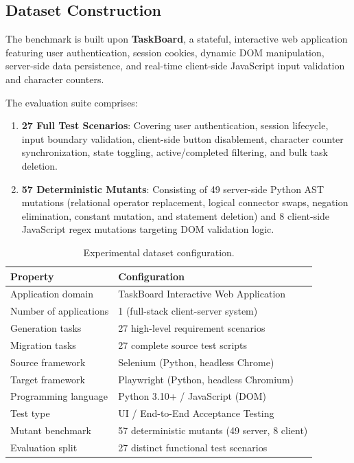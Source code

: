 \documentclass[pdflatex,sn-mathphys-num]{sn-jnl}
\begin{document}
\subsection{Dataset Construction}
\label{subsec:dataset}

The benchmark is built upon \textbf{TaskBoard}, a stateful, interactive web
application featuring user authentication, session cookies, dynamic DOM
manipulation, server-side data persistence, and real-time client-side JavaScript
input validation and character counters.

The evaluation suite comprises:
\begin{enumerate}[leftmargin=*]
    \item \textbf{27 Full Test Scenarios}: Covering user authentication, session
    lifecycle, input boundary validation, client-side button disablement,
    character counter synchronization, state toggling, active/completed filtering,
    and bulk task deletion.
    \item \textbf{57 Deterministic Mutants}: Consisting of 49 server-side Python
    AST mutations (relational operator replacement, logical connector swaps,
    negation elimination, constant mutation, and statement deletion) and 8
    client-side JavaScript regex mutations targeting DOM validation logic.
\end{enumerate}

\begin{table}[t]
\centering
\caption{Experimental dataset configuration.}
\label{tab:dataset}
\small
\begin{tabular}{ll}
\toprule
\textbf{Property} & \textbf{Configuration} \\
\midrule
Application domain & TaskBoard Interactive Web Application \\
Number of applications & 1 (full-stack client-server system) \\
Generation tasks & 27 high-level requirement scenarios \\
Migration tasks & 27 complete source test scripts \\
Source framework & Selenium (Python, headless Chrome) \\
Target framework & Playwright (Python, headless Chromium) \\
Programming language & Python 3.10+ / JavaScript (DOM) \\
Test type & UI / End-to-End Acceptance Testing \\
Mutant benchmark & 57 deterministic mutants (49 server, 8 client) \\
Evaluation split & 27 distinct functional test scenarios \\
\bottomrule
\end{tabular}
\end{table}
\end{document}
